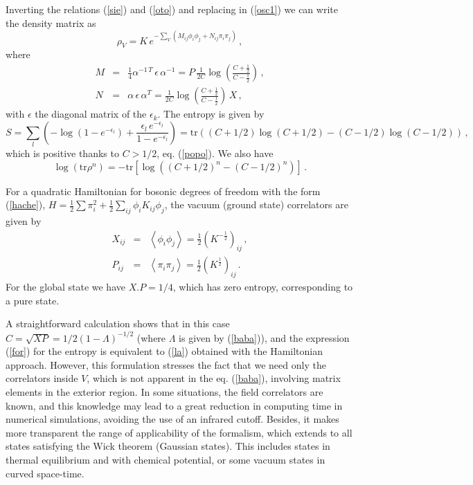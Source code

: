 \documentclass[a4paper]{article}
\begin{document}
 Inverting the relations (\ref{sie}) and (\ref{oto}) and replacing in (\ref{osc1}) we can write the density matrix as
\begin{equation}
\rho _{V}=K\,e^{-\sum_V \left( M_{ij} \phi_i \phi_j + N_{ij} \pi_i \pi_j \right)}\,,  \label{osc}
\end{equation}
where
\begin{eqnarray}
M&=&\frac{1}{4} \alpha^{-1\,T} \,\epsilon \,\alpha^{-1}=P\,\frac{1}{2 C}\log\left(\frac{C+\frac{1}{2}}{C-\frac{1}{2}}\right)\,,\\
N&=&\alpha \,\epsilon \,\alpha^T=\frac{1}{2 C}\log\left(\frac{C+\frac{1}{2}}{C-\frac{1}{2}}\right)\,X\,,
\end{eqnarray}
with $\epsilon$ the diagonal matrix of the $\epsilon_k$. The entropy is given by
\begin{equation}
S=\sum_l \left(-\log (1-e^{-\epsilon _{l}})+\frac{\epsilon _{l}\, e^{-\epsilon _{l}}}{
1-e^{-\epsilon _{l}}}\right)=\textrm{tr}\left(( C+1/2)\log (C+1/2)-(C-1/2)\log (C-1/2)\right)\,,  \label{for}
\end{equation}
which is positive thanks to  $C >1/2$, eq. (\ref{popo}). We also have
\begin{equation} 
\log (\textrm{tr}\rho^n)=-\textrm{tr}\left[ \log\left((C+1/2)^n-(C-1/2)^n\right)\right]\,.
\end{equation}

For a quadratic Hamiltonian for bosonic degrees of freedom with the form (\ref{hache}),   
$
H=\frac{1}{2}\sum \pi _{i}^{2}+\frac{1}{2}\sum_{ij}\phi _{i}K_{ij}\phi
_{j}$, the vacuum (ground state) correlators are given by 
\begin{eqnarray}
X_{ij} &=&\left\langle \phi _{i}\phi _{j}\right\rangle =\frac{1}{2}(K^{-
\frac{1}{2}})_{ij}\,,  \label{x} \\
P_{ij} &=&\left\langle \pi _{i}\pi _{j}\right\rangle =\frac{1}{2}(K^{\frac{1
}{2}})_{ij}\,. \label{p}
\end{eqnarray}
For the global state we have $X.P=1/4$, which has zero entropy, corresponding to a pure state. 

A straightforward calculation shows that in this case $C=\sqrt{XP}=1/2(1-\Lambda)^{-1/2}$ (where $\Lambda$ is given by (\ref{baba})), and the expression (\ref{for}) for the entropy is equivalent to (\ref{la}) obtained with the Hamiltonian approach. However, this formulation stresses the fact that we need only the correlators inside $V$, which is not apparent in the eq. (\ref{baba}), involving matrix elements in the exterior region. In some situations, the field correlators are known, and this knowledge may lead to a great reduction in computing time in numerical simulations, avoiding the use of an infrared cutoff. Besides, it makes more transparent the range of applicability of the formalism, which extends to all states satisfying the Wick theorem (Gaussian states). This includes states in thermal equilibrium and with chemical potential, or some vacuum states in curved space-time. 
 
\end{document}

